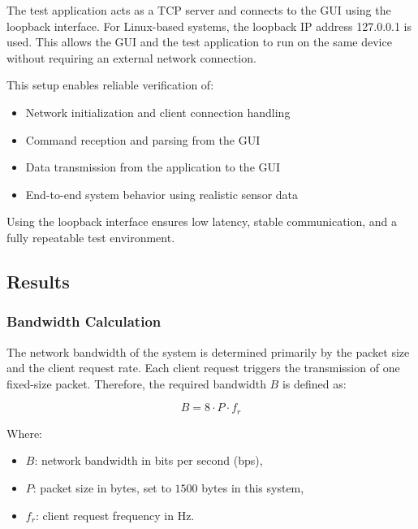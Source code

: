 The test application acts as a TCP server and connects to the GUI using the 
loopback interface. For Linux-based systems, the loopback IP address 127.0.0.1 is 
used. This allows the GUI and the test application to run on the same device 
without requiring an external network connection.

This setup enables reliable verification of:

\begin{itemize}
    \item Network initialization and client connection handling
    \item Command reception and parsing from the GUI
    \item Data transmission from the application to the GUI
    \item End-to-end system behavior using realistic sensor data 
\end{itemize}



Using the loopback interface ensures low latency, stable communication, and a fully repeatable test environment.




\newpage
\subsection{Results}

\subsubsection{Bandwidth Calculation}

The network bandwidth of the system is determined primarily by the packet size and the client request rate. Each client request triggers the transmission of one fixed-size packet. Therefore, the required bandwidth $B$ is defined as:

\begin{equation}
B = 8 \cdot P \cdot f_r
\end{equation}


Where:
\begin{itemize}
    \item[] $B$: network bandwidth in bits per second (bps),
    \item[] $P$: packet size in bytes, set to $1500$ bytes in this system,
    \item[] $f_r$: client request frequency in Hz.
\end{itemize}



